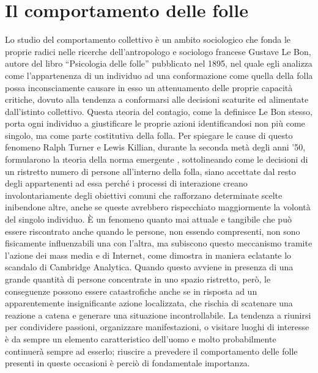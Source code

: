 \section{Il comportamento delle folle}
Lo studio del comportamento collettivo è un ambito sociologico che fonda le proprie radici nelle ricerche dell'antropologo e sociologo francese Gustave Le Bon, autore del libro \enquote{Psicologia delle folle} \cite{Bon1895} pubblicato nel 1895, nel quale egli analizza come l'appartenenza di un individuo ad una conformazione come quella della folla possa inconsciamente causare in esso un attenuamento delle proprie capacità critiche, dovuto alla tendenza a conformarsi alle decisioni scaturite ed alimentate dall'istinto collettivo. Questa \i{teoria del contagio}, come la definisce Le Bon stesso, porta ogni individuo a giustificare le proprie azioni identificandosi non più come singolo, ma come parte costitutiva della folla. \newline
Per spiegare le cause di questo fenomeno Ralph Turner e Lewis Killian, durante la seconda metà degli anni '50, formularono la \i{teoria della norma emergente} \cite{Turner1957}, sottolineando come le decisioni di un ristretto numero di persone all'interno della folla, siano accettate dal resto degli appartenenti ad essa perché i processi di interazione creano involontariamente degli obiettivi comuni che rafforzano determinate scelte inibendone altre, anche se queste avrebbero rispecchiato maggiormente la volontà del singolo individuo. \newline
È un fenomeno quanto mai attuale e tangibile che può essere riscontrato anche quando le persone, non essendo compresenti, non sono fisicamente influenzabili una con l'altra, ma subiscono questo meccanismo tramite l'azione dei mass media e di Internet, come dimostra in maniera eclatante lo scandalo di Cambridge Analytica. \newline
Quando questo avviene in presenza di una grande quantità di persone concentrate in uno spazio ristretto, però, le conseguenze possono essere catastrofiche anche se in risposta ad un apparentemente insignificante azione localizzata, che rischia di scatenare una reazione a catena e generare una situazione incontrollabile. \newline
La tendenza a riunirsi per condividere passioni, organizzare manifestazioni, o visitare luoghi di interesse è da sempre un elemento caratteristico dell'uomo e molto probabilmente continuerà sempre ad esserlo; riuscire a prevedere il comportamento delle folle presenti in queste occasioni è perciò di fondamentale importanza.

